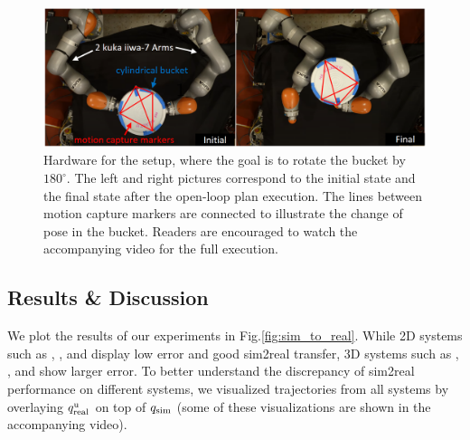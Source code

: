 \begin{figure}[thpb]
\centering\includegraphics[width = 1.0\linewidth]{figures/03_contact_rich_planning/hardware_setup.png}
\caption{Hardware for the  setup, where the goal is to rotate the bucket by $180^\circ$. The left and right pictures correspond to the initial state and the final state after the open-loop plan execution. The lines between motion capture markers are connected to illustrate the change of pose in the bucket. Readers are encouraged to watch the accompanying video for the full execution.} 
\label{fig:hardware}
\end{figure}


\subsection{Results \& Discussion}
We plot the results of our experiments in Fig.\ref{fig:sim_to_real}. While 2D systems such as , , and  display low error and good sim2real transfer, 3D systems such as , ,  and  show larger error. To better understand the discrepancy of sim2real performance on different systems, we visualized trajectories from all systems by overlaying $q^\mathrm{u}_{\mathrm{real}}$ on top of $q_{\mathrm{sim}}$ (some of these visualizations are shown in the accompanying video). 

